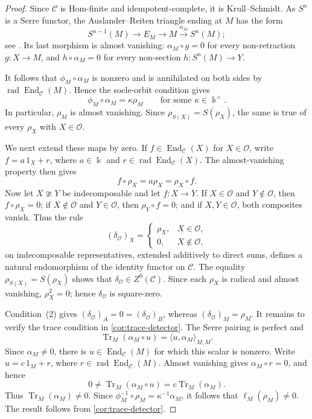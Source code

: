 \documentclass[a4paper,11pt,reqno]{amsart}
\theoremstyle{definition}
\theoremstyle{plain}
\numberwithin{equation}{section}
\newcommand{\C}{\mathcal C}
\newcommand{\End}{\operatorname{End}}
\newcommand{\kk}{\Bbbk}
\begin{document}
\begin{proof}
Since \(\C\) is Hom-finite and idempotent-complete, it is
Krull--Schmidt.  As \(S^n\) is a Serre functor, the
Auslander--Reiten triangle ending at \(M\) has the form
\[
 S^{n-1}(M)\longrightarrow E_M\longrightarrow M
 \xrightarrow{\alpha_M}S^n(M);
\]
see \cite[Proposition~I.2.3 and Theorem~I.2.4]
{ReitenVanDenBergh2002}.  Its last morphism is almost vanishing:
\(\alpha_M\circ g=0\) for every non-retraction \(g:X\to M\), and
\(h\circ\alpha_M=0\) for every non-section
\(h:S^n(M)\to Y\).

It follows that \(\phi_M\circ\alpha_M\) is nonzero and is annihilated on
both sides by \(\operatorname{rad}\End_{\C}(M)\).  Hence the socle-orbit
condition gives
\[
 \phi_M\circ\alpha_M=\kappa\rho_M
 \qquad\text{for some }\kappa\in\kk^\times.
\]
In particular, \(\rho_M\) is almost vanishing.  Since
\(\rho_{S(X)}=S(\rho_X)\), the same is true of every \(\rho_X\) with
\(X\in\mathcal O\).

We next extend these maps by zero.  If
\(f\in\End_{\C}(X)\) for \(X\in\mathcal O\), write
\(f=a\,1_X+r\), where \(a\in\kk\) and
\(r\in\operatorname{rad}\End_{\C}(X)\).  The almost-vanishing property
then gives
\[
 f\circ\rho_X=a\rho_X=\rho_X\circ f.
\]
Now let \(X\ncong Y\) be indecomposable and let \(f:X\to Y\).  If
\(X\in\mathcal O\) and \(Y\notin\mathcal O\), then
\(f\circ\rho_X=0\); if \(X\notin\mathcal O\) and
\(Y\in\mathcal O\), then \(\rho_Y\circ f=0\); and if
\(X,Y\in\mathcal O\), both composites vanish.  Thus the rule
\[
 (\delta_{\mathcal O})_X=
 \begin{cases}
  \rho_X,&X\in\mathcal O,\\
  0,&X\notin\mathcal O,
 \end{cases}
\]
on indecomposable representatives, extended additively to direct sums,
defines a natural endomorphism of the identity functor on \(\C\).
The equality \(\rho_{S(X)}=S(\rho_X)\) shows that
\(\delta_{\mathcal O}\in Z^0(\C)\).  Since each \(\rho_X\) is radical
and almost vanishing, \(\rho_X^2=0\); hence
\(\delta_{\mathcal O}\) is square-zero.

Condition~\textup{(2)} gives
\((\delta_{\mathcal O})_A=0=(\delta_{\mathcal O})_B\), whereas
\((\delta_{\mathcal O})_M=\rho_M\).  It remains to verify the trace
condition in \cref{cor:trace-detector}.  The Serre pairing is perfect and
\[
 \operatorname{Tr}_M(\alpha_M\circ u)
 =\langle u,\alpha_M\rangle_{M,M}.
\]
Since \(\alpha_M\ne0\), there is \(u\in\End_{\C}(M)\) for which this
scalar is nonzero.  Write
\(u=c\,1_M+r\), where \(r\in\operatorname{rad}\End_{\C}(M)\).
Almost vanishing gives \(\alpha_M\circ r=0\), and hence
\[
 0\ne\operatorname{Tr}_M(\alpha_M\circ u)
 =c\operatorname{Tr}_M(\alpha_M).
\]
Thus \(\operatorname{Tr}_M(\alpha_M)\ne0\).  Since
\(\phi_M^{-1}\circ\rho_M=\kappa^{-1}\alpha_M\), it follows that
\(\ell_M(\rho_M)\ne0\).  The result follows from
\cref{cor:trace-detector}.
\end{proof}
\end{document}
